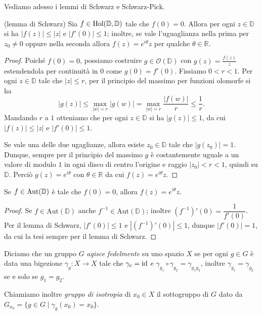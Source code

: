 Vediamo adesso i lemmi di Schwarz e Schwarz-Pick.

\begin{lm}
  (lemma di Schwarz) Sia $f \in \text{\normalfont{Hol}}(\mathbb{D},\mathbb{D})$ tale che $f(0)=0$. Allora per ogni $z \in \mathbb{D}$ si ha $|f(z)| \le |z|$ e $|f'(0)| \le 1$; inoltre, se vale l'uguaglianza nella prima per $z_0 \not=0$ oppure nella seconda allora $f(z)=e^{i\theta}z$ per qualche $\theta \in \mathbb{R}$.
\end{lm}

\begin{proof}
  Poiché $f(0)=0$, possiamo costruire $g \in \mathcal{O}(\mathbb{D})$ con $g(z)=\frac{f(z)}{z}$ estendendola per continuità in $0$ come $g(0)=f'(0)$. Fissiamo $0<r<1$.
  Per ogni $z \in \mathbb{D}$ tale che $|z| \le r$, per il principio del massimo per funzioni olomorfe si ha
  $$|g(z)| \le \max_{|w|=r} |g(w)|=\max_{|w|=r} \frac{|f(w)|}{r} \le \frac{1}{r}.$$
  Mandando $r$ a $1$ otteniamo che per ogni $z \in \mathbb{D}$ si ha $|g(z)| \le 1$, da cui $|f(z)|\le |z|$ e $|f'(0)| \le 1$.

  Se vale una delle due ugaglianze, allora esiste $z_0 \in \mathbb{D}$ tale che $|g(z_0)|=1$. Dunque, sempre per il principio del massimo $g$ è costantemente uguale a un valore di modulo $1$ in ogni disco di centro l'origine e raggio $|z_0|<r<1$, quindi su $\mathbb{D}$. Perciò $g(z)=e^{i\theta}$ con $\theta \in \mathbb{R}$ da cui $f(z)=e^{i\theta}z$.
\end{proof}

\begin{cor} \label{cor_schw}
  Se $f \in \text{\normalfont{Aut}}(\mathbb{D})$ è tale che $f(0)=0$, allora $f(z)=e^{i\theta}z$.
\end{cor}

\begin{proof}
  Se $f \in \text{Aut}(\mathbb{D})$ anche $f^{-1} \in \text{Aut}(\mathbb{D})$; inoltre $(f^{-1})'(0)=\dfrac{1}{f'(0)}$. Per il lemma di Schwarz, $|f'(0)| \le 1$ e $|(f^{-1})'(0)| \le 1$, dunque $|f'(0)|=1$, da cui la tesi sempre per il lemma di Schwarz.
\end{proof}

\begin{defn}
  Diciamo che un gruppo $G$ \textit{agisce fedelmente} su uno spazio $X$ se per ogni $g \in G$ è data una bigezione $\gamma_g:X \longrightarrow X$ tale che $\gamma_{e}=\operatorname{id}$ e $\gamma_{g_1} \circ \gamma_{g_2} =\gamma_{g_1g_2}$, inoltre $\gamma_{g_1}=\gamma_{g_2}$ se e solo se $g_1=g_2$.

  Chiamiamo inoltre \textit{gruppo di isotropia} di $x_0 \in X$ il sottogruppo di $G$ dato da $G_{x_0}=\{g \in G \mid \gamma_g(x_0)=x_0\}$.
\end{defn}

